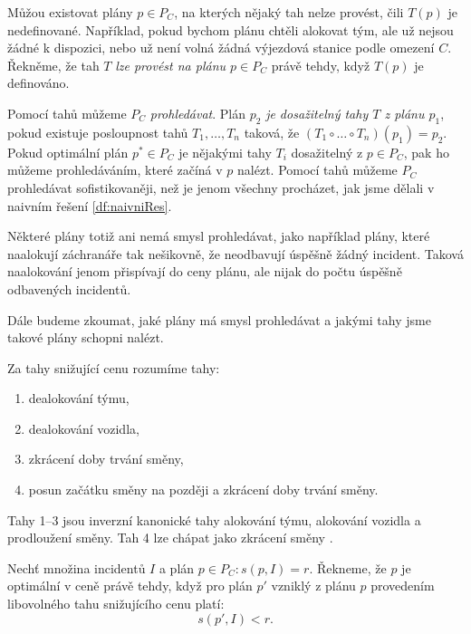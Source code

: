 Můžou existovat plány $p \in P_C$, na kterých nějaký tah nelze provést, čili $T(p)$ je nedefinované.
Například, pokud bychom plánu chtěli alokovat tým, ale už nejsou žádné k dispozici, nebo už není volná žádná výjezdová stanice podle omezení $C$.
Řekněme, že tah $T$ \textit{lze provést na plánu $p \in P_C$} právě tehdy, když $T(p)$ je definováno.

Pomocí tahů můžeme $P_C$ \textit{prohledávat}.
Plán $p_2$ \textit{je dosažitelný tahy $T$ z plánu $p_1$}, pokud existuje posloupnost tahů $T_1, \dots, T_n$ taková, že $(T_1 \circ \dots \circ T_n)(p_1) = p_2$.
Pokud optimální plán $p^* \in P_C$ je nějakými tahy $T_i$ dosažitelný z $p \in P_C$, pak ho můžeme prohledáváním, které začíná v $p$ nalézt.
Pomocí tahů můžeme $P_C$ prohledávat sofistikovaněji, než je jenom všechny procházet, jak jsme dělali v naivním řešení \ref{df:naivniRes}.

Některé plány totiž ani nemá smysl prohledávat, jako například plány, které naalokují záchranáře tak nešikovně, že neodbavují úspěšně žádný incident.
Taková naalokování jenom přispívají do ceny plánu, ale nijak do počtu úspěšně odbavených incidentů.

Dále budeme zkoumat, jaké plány má smysl prohledávat a jakými tahy jsme takové plány schopni nalézt.
\begin{definice}\label{df:invKanTahy}
  Za tahy snižující cenu rozumíme tahy:
  \begin{enumerate}
    \item
      dealokování týmu,

    \item
      dealokování vozidla,

    \item
      zkrácení doby trvání směny,

    \item
      posun začátku směny na později a zkrácení doby trvání směny.

  \end{enumerate}
\end{definice}

Tahy 1--3 jsou inverzní kanonické tahy alokování týmu, alokování vozidla a prodloužení směny.
Tah 4 lze chápat jako zkrácení směny .

\begin{definice}\label{df:planOptVCene}
  Nechť množina incidentů $I$ a plán $p \in P_C \colon s(p, I) = r$.
  Řekneme, že $p$ je optimální v ceně právě tehdy, když
  pro plán $p'$ vzniklý z plánu $p$ provedením libovolného tahu snižujícího cenu platí: 
  \begin{equation*}
    s(p', I) < r.
  \end{equation*}
\end{definice}

